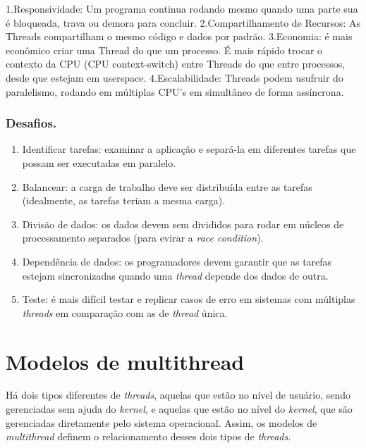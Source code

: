 1.Responsividade: Um programa continua rodando mesmo quando uma parte
sua é bloqueada, trava ou demora para concluir. 2.Compartilhamento de
Recursos: As Threads compartilham o mesmo código e dados por padrão.
3.Economia: é mais econômico criar uma Thread do que um processo. É mais
rápido trocar o contexto da CPU (CPU context-switch) entre Threads do
que entre processos, desde que estejam em userspace. 4.Escalabilidade:
Threads podem usufruir do paralelismo, rodando em múltiplas CPU's em
simultâneo de forma assíncrona.

\hypertarget{desafios.}{%
\subsubsection{Desafios.}\label{desafios.}}

\begin{enumerate}
\def\labelenumi{\arabic{enumi}.}
\tightlist
\item
  Identificar tarefas: examinar a aplicação e separá-la em diferentes
  tarefas que possam ser executadas em paralelo.
\item
  Balancear: a carga de trabalho deve ser distribuída entre as tarefas
  (idealmente, as tarefas teriam a mesma carga).
\item
  Divisão de dados: os dados devem sem divididos para rodar em núcleos
  de processamento separados (para evirar a \emph{race condition}).
\item
  Dependência de dados: os programadores devem garantir que as tarefas
  estejam sincronizadas quando uma \emph{thread} depende dos dados de
  outra.
\item
  Teste: é mais difícil testar e replicar casos de erro em sistemas com
  múltiplas \emph{threads} em comparação com as de \emph{thread} única.
\end{enumerate}

\hypertarget{modelos-de-multithread}{%
\section{Modelos de multithread}\label{modelos-de-multithread}}

Há dois tipos diferentes de \emph{threads}, aquelas que estão no nível
de usuário, sendo gerenciadas sem ajuda do \emph{kernel}, e aquelas que
estão no nível do \emph{kernel}, que são gerenciadas diretamente pelo
sistema operacional. Assim, os modelos de \emph{multithread} definem o
relacionamento desses dois tipos de \emph{threads}.


